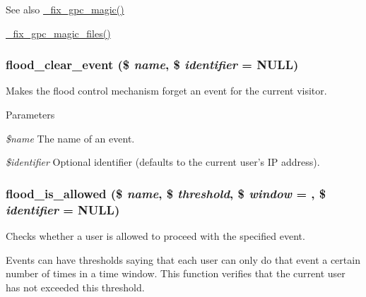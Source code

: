 \begin{DoxySeeAlso}{See also}
\hyperlink{common_8inc_a4060ad61de80e6b8931ce8ad3c3aaebc}{\_\-fix\_\-gpc\_\-magic()} 

\hyperlink{common_8inc_aca820a7438df9d2244148e4b8895291e}{\_\-fix\_\-gpc\_\-magic\_\-files()} 
\end{DoxySeeAlso}
\hypertarget{common_8inc_acf1b82b44af425575c6b1137e9b1e65a}{
\subsubsection[{flood\_\-clear\_\-event}]{\setlength{\rightskip}{0pt plus 5cm}flood\_\-clear\_\-event (\$ {\em name}, \/  \$ {\em identifier} = {\ttfamily NULL})}}
\label{common_8inc_acf1b82b44af425575c6b1137e9b1e65a}
Makes the flood control mechanism forget an event for the current visitor.


\begin{DoxyParams}{Parameters}
\item[{\em \$name}]The name of an event. \item[{\em \$identifier}]Optional identifier (defaults to the current user's IP address). \end{DoxyParams}
\hypertarget{common_8inc_a4c6d4ab47d558e42ac08f5fbf90f2d6f}{
\subsubsection[{flood\_\-is\_\-allowed}]{\setlength{\rightskip}{0pt plus 5cm}flood\_\-is\_\-allowed (\$ {\em name}, \/  \$ {\em threshold}, \/  \$ {\em window} = {}, \/  \$ {\em identifier} = {\ttfamily NULL})}}
\label{common_8inc_a4c6d4ab47d558e42ac08f5fbf90f2d6f}
Checks whether a user is allowed to proceed with the specified event.

Events can have thresholds saying that each user can only do that event a certain number of times in a time window. This function verifies that the current user has not exceeded this threshold.


